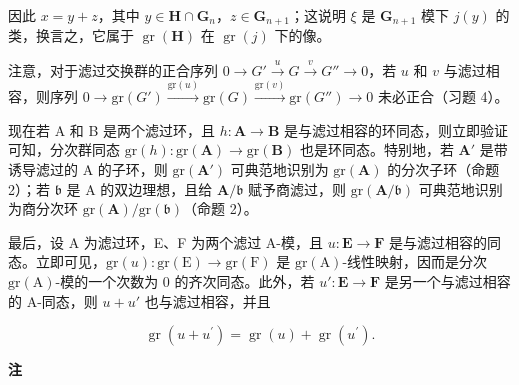 	因此 \(x = y + z\)，其中 \(y \in \mathbf{H} \cap \mathbf{G}_n\)，\(z \in \mathbf{G}_{n+1}\)；这说明 \(\xi\) 是 \(\mathbf{G}_{n+1}\) 模下 \(j(y)\) 的类，换言之，它属于 \(\operatorname{gr}(\mathbf{H})\) 在 \(\operatorname{gr}(j)\) 下的像。

注意，对于滤过交换群的正合序列 \(0 \to G' \xrightarrow{u} G \xrightarrow{v} G'' \to 0\)，若 \(u\) 和 \(v\) 与滤过相容，则序列 \(0 \longrightarrow \text{gr}(G') \xrightarrow{\text{gr}(u)} \text{gr}(G) \xrightarrow{\text{gr}(v)} \text{gr}(G'') \longrightarrow 0\) 未必正合（习题 4）。

现在若 A 和 B 是两个滤过环，且 \(h \colon \mathbf{A} \to \mathbf{B}\) 是与滤过相容的环同态，则立即验证可知，分次群同态 \(\mathrm{gr}(h) \colon \mathrm{gr}(\mathbf{A}) \to \mathrm{gr}(\mathbf{B})\) 也是环同态。特别地，若 \(\mathbf{A}'\) 是带诱导滤过的 A 的子环，则 \(\mathrm{gr}(\mathbf{A}')\) 可典范地识别为 \(\mathrm{gr}(\mathbf{A})\) 的分次子环（命题 2）；若 \(\mathfrak{b}\) 是 A 的双边理想，且给 \(\mathbf{A} / \mathfrak{b}\) 赋予商滤过，则 \(\mathrm{gr}(\mathbf{A} / \mathfrak{b})\) 可典范地识别为商分次环 \(\mathrm{gr}(\mathbf{A}) / \mathrm{gr}(\mathfrak{b})\)（命题 2）。

最后，设 A 为滤过环，E、F 为两个滤过 A-模，且 \(u: \mathbf{E} \to \mathbf{F}\) 是与滤过相容的同态。立即可见，\(\mathrm{gr}(u): \mathrm{gr}(\mathrm{E}) \to \mathrm{gr}(\mathrm{F})\) 是 \(\mathrm{gr}(\mathrm{A})\)-线性映射，因而是分次 \(\mathrm{gr}(\mathrm{A})\)-模的一个次数为 0 的齐次同态。此外，若 \(u': \mathbf{E} \to \mathbf{F}\) 是另一个与滤过相容的 A-同态，则 \(u + u'\) 也与滤过相容，并且

\[
\operatorname{gr} (u + u ^ {\prime}) = \operatorname{gr} (u) + \operatorname{gr} (u ^ {\prime}).\tag{14}
\]

\textbf{注}\par

